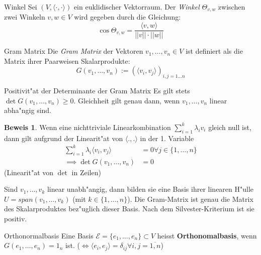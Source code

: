 \documentclass[oneside,fontsize=11pt,paper=a4,BCOR=0mm,DIV=12,automark,headsepline]{scrbook}
\theoremstyle{remark}
\theoremstyle{definition}
\theoremstyle{definition}
\newtheorem*{prof}{Beweis}
\theoremstyle{remark}
\begin{document}
\begin{definition}{Winkel}{}
  Sei $(V, \langle {\cdot,\cdot} \rangle)$ ein euklidischer Vektorraum. Der \emph{Winkel}
  $\Theta_{v,w}$ zwischen zwei Winkeln $v,w\in V$ wird gegeben durch die Gleichung: \[\cos
    \Theta_{v,w} = \frac{\langle v, w\rangle}{||v||\cdot ||w||}\]
\end{definition}
\begin{definition}{Gram Matrix}{}
  Die \emph{Gram Matrix} der Vektoren $v_1, \ldots, v_n \in V$ ist definiert
  als die Matrix ihrer Paarweisen Skalarprodukte:
  \[G(v_1, \ldots, v_n):= (\langle v_i, v_j \rangle)_{i,j=1\ldots n}\]
\end{definition}
\begin{satz}{Positivit"at der Determinante der Gram Matrix}{}
  Es gilt stets $\det G(v_1, \ldots, v_n) \geq 0$. Gleichheit gilt genau dann, wenn \(v_1,\dots,v_n\)
  linear abha"ngig sind.
\end{satz}
\begin{prof}
  Wenn eine nichttriviale Linearkombination \(\sum_{i=1}^k \lambda_iv_i\) gleich null ist, dann gilt aufgrund der Linearit"at von \(\langle ., .\rangle\) in der 1. Variable \begin{align*}\sum_{i=1}^k \lambda_i\langle v_i, v_j\rangle &= 0 \forall j\in \{1, \dots, n\} \\ \implies \det G(v_1, \dots, v_n) &= 0\end{align*} (Linearit"at von \(\det\) in Zeilen)

  Sind \(v_1, \dots, v_k\) linear unabh"angig, dann bilden sie eine Basis ihrer linearen H"ulle \(U = span(v_1, \dots, v_k)\) (mit \(k \in \{1,\dots, n\}\)). Die Gram-Matrix ist genau die Matrix des Skalarproduktes bez"uglich dieser Basis. Nach dem Silvester-Kriterium ist sie positiv.
\end{prof}

\begin{definition}{Orthonormalbasis}{}
  Eine Basis $\mathcal{E} = \{e_1, \ldots, e_n\} \subset V$ heisst
  \textbf{Orthonomalbasis}, wenn $G(e_1, \ldots, e_n) = 1_n$ ist. ($\iff \langle
  e_i, e_j \rangle = \delta_{ij} \forall i,j = \overline{1,n}$)
\end{definition}


\end{document}
